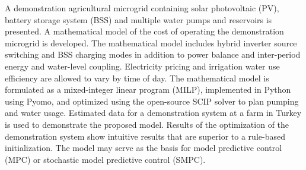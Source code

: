 A demonstration agricultural microgrid containing solar photovoltaic (PV), battery storage system (BSS) and multiple water pumps and reservoirs is presented.
A mathematical model of the cost of operating the demonstration microgrid is developed.
The mathematical model includes hybrid inverter source switching and BSS charging modes in addition to power balance and inter-period energy and water-level coupling.
Electricity pricing and irrigation water use efficiency are allowed to vary by time of day.
The mathematical model is formulated as a mixed-integer linear program (MILP),
implemented in Python using Pyomo, and optimized using the open-source SCIP solver to plan pumping and water usage.
Estimated data for a demonstration system at a farm in Turkey is used to demonstrate the proposed model.
Results of the optimization of the demonstration system show intuitive results that are superior to a rule-based initialization.
The model may serve as the basis for model predictive control (MPC) or stochastic model predictive control (SMPC).